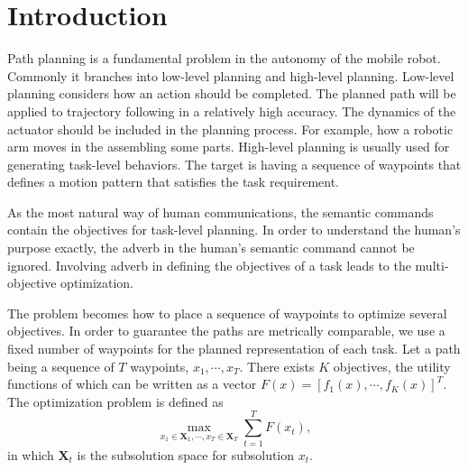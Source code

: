 \section{Introduction}

Path planning is a fundamental problem in the autonomy of the mobile robot.
Commonly it branches into low-level planning and high-level planning.
Low-level planning considers how an action should be completed.
The planned path will be applied to trajectory following in a relatively high accuracy.
The dynamics of the actuator should be included in the planning process.
For example, how a robotic arm moves in the assembling some parts. 
High-level planning is usually used for generating task-level behaviors.
The target is having a sequence of waypoints that defines a motion pattern that satisfies the task requirement.

As the most natural way of human communications, the semantic commands contain the objectives for task-level planning.
In order to understand the human's purpose exactly, the adverb in the human's semantic command cannot be ignored.
Involving adverb in defining the objectives of a task leads to the multi-objective optimization.

The problem becomes how to place a sequence of waypoints to optimize several objectives.
In order to guarantee the paths are metrically comparable, we use a fixed number of waypoints for the planned representation of each task.
Let a path being a sequence of $ T $ waypoints, $ x_{1} , \cdots , x_{T} $.
There exists $ K $ objectives, the utility functions of which can be written as a vector $ F(x) = [ f_{1}(x) , \cdots , f_{K}(x) ]^{T} $.
The optimization problem is defined as
\begin{equation}
\max_{ x_{1} \in \mathbf{X}_{1} , \cdots , x_{T} \in \mathbf{X}_{T} } \sum_{t=1}^{T} F(x_{t}),
\end{equation}
in which $ \mathbf{X}_{t}  $ is the subsolution space for subsolution $ x_{t} $.

